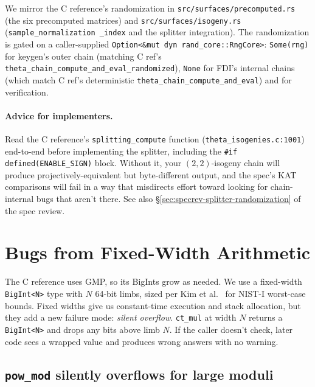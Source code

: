 We mirror the C reference's randomization in
\texttt{src/surfaces/precomputed.rs} (the six precomputed matrices)
and \texttt{src/surfaces/isogeny.rs} (\texttt{sample\_normalization
\_index} and the splitter integration).  The randomization is gated
on a caller-supplied \texttt{Option<\&mut dyn rand\_core::RngCore>}:
\texttt{Some(rng)} for keygen's outer chain (matching C ref's
\texttt{theta\_chain\_compute\_and\_eval\_randomized}), \texttt{None}
for FDI's internal chains (which match C ref's deterministic
\texttt{theta\_chain\_compute\_and\_eval}) and for verification.

\paragraph{Advice for implementers.}  Read the C reference's
\texttt{splitting\_compute} function (\texttt{theta\_isogenies.c:1001})
end-to-end before implementing the splitter, including the
\texttt{\#if defined(ENABLE\_SIGN)} block.  Without it, your $(2,
2)$-isogeny chain will produce projectively-equivalent but
byte-different output, and the spec's KAT comparisons will fail in
a way that misdirects effort toward looking for chain-internal bugs
that aren't there.  See also
\S\ref{sec:specrev-splitter-randomization} of the spec review.

\section{Bugs from Fixed-Width Arithmetic}
\label{sec:fixed-width-bugs}

The C reference uses GMP, so its BigInts grow as needed.  We use a
fixed-width \texttt{BigInt<N>} type with $N$ 64-bit limbs, sized per
Kim et al.~\cite{EPRINT:KLKL25} for NIST-I worst-case bounds.
Fixed widths give us constant-time execution and stack allocation, but
they add a new failure mode: \emph{silent overflow}.  \texttt{ct\_mul}
at width $N$ returns a \texttt{BigInt<N>} and drops any bits above
limb $N$.  If the caller doesn't check, later code sees a wrapped
value and produces wrong answers with no warning.

\subsection{\texttt{pow\_mod} silently overflows for large moduli}
\label{sec:bug-pow-mod}

